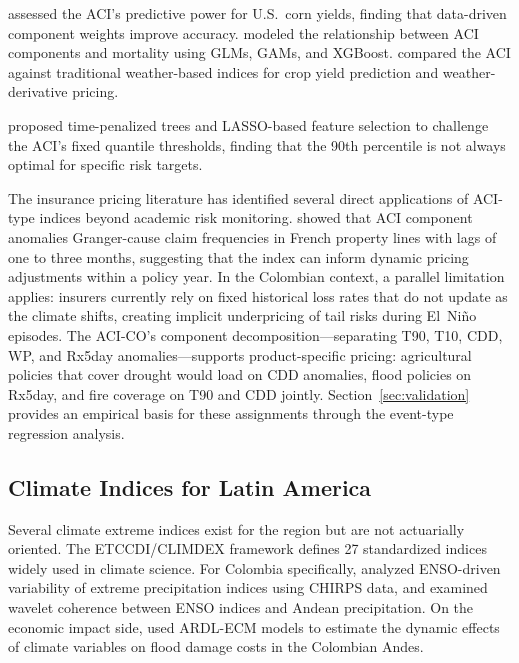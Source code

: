 \documentclass[12pt]{article}
\begin{document}
\citet{pan2022} assessed the ACI's predictive power for U.S.\ corn yields, finding that data-driven component weights improve accuracy. \citet{zhou2024mortality} modeled the relationship between ACI components and mortality using GLMs, GAMs, and XGBoost. \citet{yavrum2025} compared the ACI against traditional weather-based indices for crop yield prediction and weather-derivative pricing.
 
\citet{valla2025} proposed time-penalized trees and LASSO-based feature selection to challenge the ACI's fixed quantile thresholds, finding that the 90th percentile is not always optimal for specific risk targets.

The insurance pricing literature has identified several direct applications of ACI-type indices beyond academic risk monitoring. \citet{garrido2023faci} showed that ACI component anomalies Granger-cause claim frequencies in French property lines with lags of one to three months, suggesting that the index can inform dynamic pricing adjustments within a policy year. In the Colombian context, a parallel limitation applies: insurers currently rely on fixed historical loss rates that do not update as the climate shifts, creating implicit underpricing of tail risks during El~Ni\~no episodes. The ACI-CO's component decomposition---separating T90, T10, CDD, WP, and Rx5day anomalies---supports product-specific pricing: agricultural policies that cover drought would load on CDD anomalies, flood policies on Rx5day, and fire coverage on T90 and CDD jointly. Section~\ref{sec:validation} provides an empirical basis for these assignments through the event-type regression analysis.
 
\subsection{Climate Indices for Latin America}
 
Several climate extreme indices exist for the region but are not actuarially oriented. The ETCCDI/CLIMDEX framework \citep{zhang2011} defines 27 standardized indices widely used in climate science. For Colombia specifically, \citet{hurtado2021chirps} analyzed ENSO-driven variability of extreme precipitation indices using CHIRPS data, and \citet{morales2021wavelet} examined wavelet coherence between ENSO indices and Andean precipitation. On the economic impact side, \citet{martinez2024ardl} used ARDL-ECM models to estimate the dynamic effects of climate variables on flood damage costs in the Colombian Andes.
 
\end{document}

